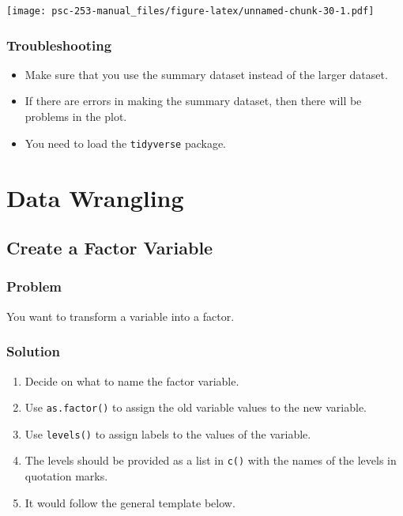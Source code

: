 \documentclass[
]{book}
\providecommand{\tightlist}{%
  \setlength{\itemsep}{0pt}\setlength{\parskip}{0pt}}
\begin{document}
\texttt{[image: psc-253-manual\_files/figure-latex/unnamed-chunk-30-1.pdf]}

\hypertarget{troubleshooting-11}{%
\subsection{Troubleshooting}\label{troubleshooting-11}}

\begin{itemize}
\tightlist
\item
  Make sure that you use the summary dataset instead of the larger dataset.
\item
  If there are errors in making the summary dataset, then there will be problems in the plot.
\item
  You need to load the \texttt{tidyverse} package.
\end{itemize}

\hypertarget{data-wrangling}{%
\chapter{Data Wrangling}\label{data-wrangling}}

\hypertarget{factor}{%
\section{Create a Factor Variable}\label{factor}}

\hypertarget{problem-14}{%
\subsection{Problem}\label{problem-14}}

You want to transform a variable into a factor.

\hypertarget{solution-14}{%
\subsection{Solution}\label{solution-14}}

\begin{enumerate}
\def\labelenumi{\arabic{enumi}.}
\tightlist
\item
  Decide on what to name the factor variable.
\item
  Use \texttt{as.factor()} to assign the old variable values to the new variable.
\item
  Use \texttt{levels()} to assign labels to the values of the variable.
\item
  The levels should be provided as a list in \texttt{c()} with the names of the levels in quotation marks.
\item
  It would follow the general template below.
\end{enumerate}
\end{document}

